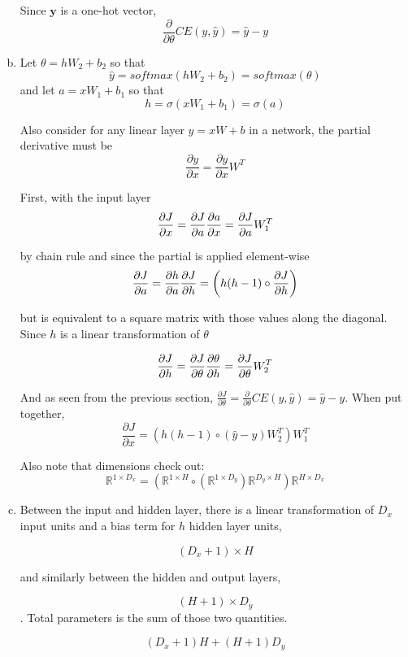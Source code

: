 \documentclass{article}
\newcommand{\dd}[2][]{\frac{\partial #1}{\partial #2}}
\newcommand{\R}[1]{\mathbb{R}^{#1}}
\begin{document}
\begin{enumerate}[(a)]
Since $\mathbf{y}$ is a one-hot vector, $$
\frac{\partial}{\partial\theta}CE(y,\hat{y}) = \hat{y} - y
$$

\item Let $\theta = h W_2 + b_2$ so that $$
\hat{y} = softmax(h W_2 + b_2) = softmax(\theta)
$$ and let $a = x W_1 + b_1$ so that $$
h = \sigma(x W_1 + b_1) = \sigma(a)
$$

Also consider for any linear layer $y = xW + b$ in a network, the partial derivative must be $$
\frac{\partial y}{\partial x} = \frac{\partial y}{\partial x} W^T
$$

First, with the input layer $$
\frac{\partial J}{\partial x} = \frac{\partial J}{\partial a} \frac{\partial a}{\partial x} \\
= \frac{\partial J}{\partial a} W_1^T
$$

by chain rule and since the partial is applied element-wise $$
\frac{\partial J}{\partial a} =  \frac{\partial h}{\partial a} \frac{\partial J}{\partial h} \\
= \left ( h(h-1) \circ \dd[J]{h} \right )
$$

but is equivalent to a square matrix with those values along the diagonal.  Since $h$ is a linear transformation of $\theta$

$$
\dd[J]{h} = \dd[J]{\theta} \dd[\theta]{h} \\
= \dd[J]{\theta} W_2^T
$$

And as seen from the previous section, $\frac{\partial J}{\partial\theta} = \frac{\partial}{\partial\theta}CE(y,\hat{y}) = \hat{y} - y$. When put together, $$
\dd[J]{x} = \left ( h(h-1) \circ (\hat{y} - y) W_2^T \right ) W_1^T
$$

Also note that dimensions check out:
$$
\R{1 \times D_x} = \left ( \R{1 \times H} \circ (\R{1 \times D_y}) \R{D_y \times H} \right ) \R{H \times D_x}
$$

\item Between the input and hidden layer, there is a linear transformation of $D_x$ input units and a bias term for $h$ hidden layer units,

$$ (D_x + 1) \times H $$

and similarly between the hidden and output layers,

$$ (H + 1) \times D_y $$.  Total parameters is the sum of those two quantities.

$$ (D_x + 1) H + (H + 1) D_y $$

\end{enumerate}
\end{document}
